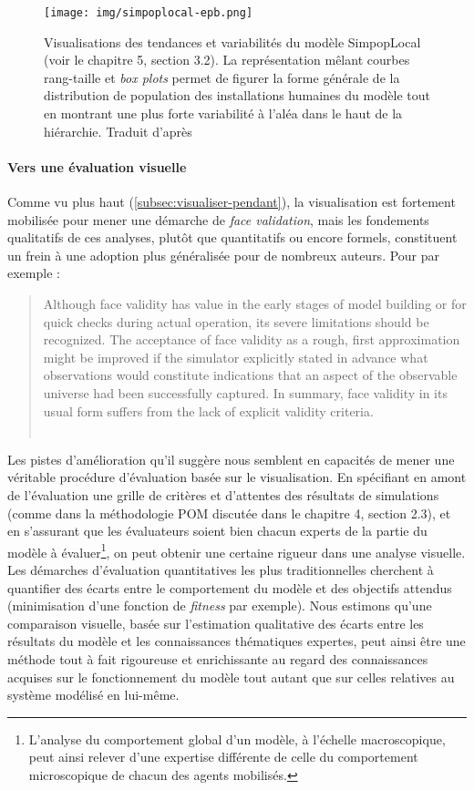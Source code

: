 \documentclass[a4paper, 12pt]{article}
\begin{document}
\begin{figure}[H]
	\centering
	\texttt{[image: img/simpoplocal-epb.png]}
	\caption{Visualisations des tendances et variabilités du modèle SimpopLocal (voir le chapitre 5, section 3.2).
	La représentation mêlant courbes rang-taille et \textit{box plots} permet de figurer la forme générale de la distribution de population des installations humaines du modèle tout en montrant une plus forte variabilité à l'aléa dans le haut de la hiérarchie.
	Traduit d'après \textcite[fig.~3, \ppno~312]{schmitt_half_2015}}
	\label{fig:simpoplocal}
\end{figure}

\paragraph{Vers une évaluation visuelle}

Comme vu plus haut (\cref{subsec:visualiser-pendant}), la visualisation est fortement mobilisée pour mener une démarche de \textit{face validation}, mais les fondements qualitatifs de ces analyses, plutôt que quantitatifs ou encore formels, constituent un frein à une adoption plus généralisée pour de nombreux auteurs.
Pour  par exemple :
\begin{quotation}
	\og Although face validity has value in the early stages of model building or for quick checks during actual operation, its severe limitations should be recognized.
	\textelp{}
	The acceptance of face validity as a rough, first approximation might be improved if the simulator explicitly stated in advance what observations would constitute indications that an aspect of the observable universe had been successfully captured. In summary, face validity in its usual form suffers from the lack of explicit validity criteria.\fg{}\\
	\mbox{}~ \hfill \cite[222]{hermann_validation_1967}
\end{quotation}
Les pistes d'amélioration qu'il suggère nous semblent en capacités de mener une véritable procédure d'évaluation basée sur le visualisation.
En spécifiant en amont de l'évaluation une grille de critères et d'attentes des résultats de simulations (comme dans la méthodologie \og POM\fg{} discutée dans le chapitre 4, section 2.3), et en s'assurant que les évaluateurs soient bien chacun experts de la partie du modèle à évaluer\footnote{
L'analyse du comportement global d'un modèle, à l'échelle macroscopique, peut ainsi relever d'une expertise différente de celle du comportement microscopique de chacun des agents mobilisés.
}, on peut obtenir une certaine rigueur dans une analyse visuelle.
Les démarches d'évaluation quantitatives les plus traditionnelles cherchent à quantifier des écarts entre le comportement du modèle et des objectifs attendus (minimisation d'une fonction de \textit{fitness} par exemple).
Nous estimons qu'une comparaison visuelle, basée sur l'estimation qualitative des écarts entre les résultats du modèle et les connaissances thématiques expertes, peut ainsi être une méthode tout à fait rigoureuse et enrichissante au regard des connaissances acquises sur le fonctionnement du modèle tout autant que sur celles relatives au système modélisé en lui-même.
\end{document}
